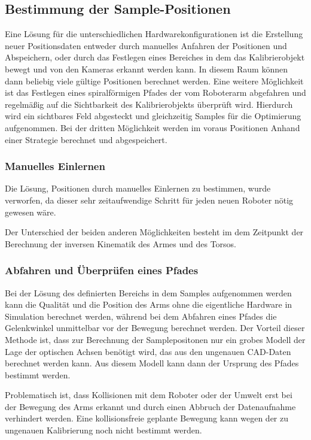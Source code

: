 \subsection{Bestimmung der Sample-Positionen}
\label{sub:Bestimmung der Sample-Positionen}

Eine Lösung für die unterschiedlichen Hardwarekonfigurationen ist die Erstellung
neuer Positionsdaten entweder durch manuelles Anfahren der Positionen und 
Abspeichern, oder durch das Festlegen eines Bereiches in dem das Kalibrierobjekt
bewegt und von den Kameras erkannt werden kann. In diesem Raum können dann
beliebig viele gültige Positionen berechnet werden. Eine weitere Möglichkeit
ist das Festlegen eines spiralförmigen Pfades der vom Roboterarm abgefahren 
und regelmäßig auf die Sichtbarkeit des Kalibrierobjekts überprüft wird. Hierdurch
wird ein sichtbares Feld abgesteckt und gleichzeitig Samples für die 
Optimierung aufgenommen. Bei der dritten Möglichkeit werden im voraus Positionen
Anhand einer Strategie berechnet und abgespeichert.

\subsubsection{Manuelles Einlernen}
\label{ssub:Manuelles Einlernen}
Die Lösung, Positionen durch manuelles Einlernen zu bestimmen, wurde verworfen,
da dieser sehr zeitaufwendige Schritt für jeden neuen Roboter nötig gewesen wäre.

Der Unterschied der beiden anderen Möglichkeiten besteht im dem Zeitpunkt der 
Berechnung der inversen Kinematik des Armes und des Torsos.

\subsubsection{Abfahren und Überprüfen eines Pfades}
\label{ssub:Abfahren und Überprüfen eines Pfades}

Bei der Lösung des 
definierten Bereichs in dem Samples aufgenommen werden kann die Qualität und die
Position des Arms ohne die eigentliche Hardware in Simulation berechnet werden, 
während bei dem Abfahren eines Pfades die Gelenkwinkel unmittelbar vor der 
Bewegung berechnet werden. Der Vorteil dieser Methode ist, dass zur Berechnung
der Samplepositonen nur ein grobes Modell der Lage der optischen Achsen benötigt
wird, das aus den ungenauen CAD-Daten berechnet werden kann. Aus diesem Modell
kann dann der Ursprung des Pfades bestimmt werden. 

Problematisch ist, dass Kollisionen mit dem Roboter oder der Umwelt erst bei
der Bewegung des Arms erkannt und durch einen Abbruch der Datenaufnahme 
verhindert werden. Eine kollisionsfreie geplante Bewegung kann wegen der zu 
ungenauen Kalibrierung noch nicht bestimmt werden.

